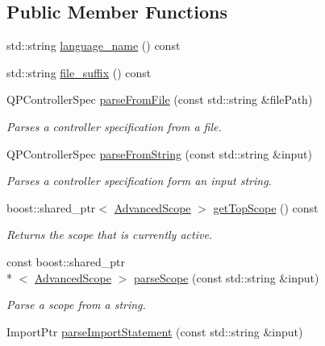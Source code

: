 \subsection*{Public Member Functions}
\begin{DoxyCompactItemize}
\item 
std\-::string \hyperlink{classgiskard__suturo_1_1GiskardPPParser_a6b478f98c1eb3b0e6ec033779ef513c0}{language\-\_\-name} () const 
\item 
std\-::string \hyperlink{classgiskard__suturo_1_1GiskardPPParser_adc21975afa4db6f4ffaafe7e4028fa11}{file\-\_\-suffix} () const 
\item 
Q\-P\-Controller\-Spec \hyperlink{classgiskard__suturo_1_1GiskardPPParser_a00550a99afb34d7989a6f5569baee5d1}{parse\-From\-File} (const std\-::string \&file\-Path)
\begin{DoxyCompactList}\small\item\em Parses a controller specification from a file. \end{DoxyCompactList}\item 
Q\-P\-Controller\-Spec \hyperlink{classgiskard__suturo_1_1GiskardPPParser_a0202ac022be6ef723f6eaba36783762e}{parse\-From\-String} (const std\-::string \&input)
\begin{DoxyCompactList}\small\item\em Parses a controller specification form an input string. \end{DoxyCompactList}\item 
boost\-::shared\-\_\-ptr$<$ \hyperlink{classgiskard__suturo_1_1AdvancedScope}{Advanced\-Scope} $>$ \hyperlink{classgiskard__suturo_1_1GiskardPPParser_a258f15e4269a48f64d2ce1b48397dc04}{get\-Top\-Scope} () const 
\begin{DoxyCompactList}\small\item\em Returns the scope that is currently active. \end{DoxyCompactList}\item 
const boost\-::shared\-\_\-ptr\\*
$<$ \hyperlink{classgiskard__suturo_1_1AdvancedScope}{Advanced\-Scope} $>$ \hyperlink{classgiskard__suturo_1_1GiskardPPParser_ab2d3195d4882590f42a92856ec84c3d1}{parse\-Scope} (const std\-::string \&input)
\begin{DoxyCompactList}\small\item\em Parse a scope from a string. \end{DoxyCompactList}\item 
Import\-Ptr \hyperlink{classgiskard__suturo_1_1GiskardPPParser_a392ed0aa7ed397d08dd0044eb00e24c6}{parse\-Import\-Statement} (const std\-::string \&input)

\end{DoxyCompactItemize}
